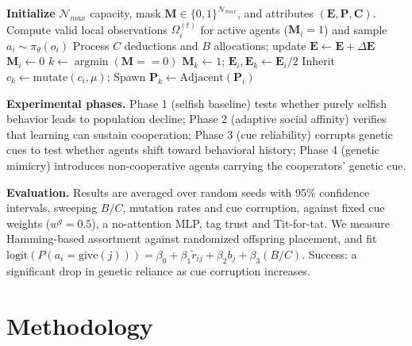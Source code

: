 \documentclass{article}
\begin{document}
\begin{algorithm}[!htbp]
\caption{Dynamic Agent Pooling and Environment Step}
\label{alg:pooling}
\begin{algorithmic}[1]
\STATE \textbf{Initialize} $\mathcal{N}_{max}$ capacity, mask $\mathbf{M} \in \{0,1\}^{\mathcal{N}_{max}}$, and attributes $(\mathbf{E}, \mathbf{P}, \mathbf{C})$.
    \STATE Compute valid local observations $\Omega_i^{(t)}$ for active agents ($\mathbf{M}_i = 1$) and sample $a_i \sim \pi_\theta(o_i)$
    \STATE Process $C$ deductions and $B$ allocations; update $\mathbf{E} \leftarrow \mathbf{E} + \Delta\mathbf{E}$
            \STATE $\mathbf{M}_i \leftarrow 0$ 
            \STATE $k \leftarrow \operatorname{argmin}(\mathbf{M} == 0)$ 
            \STATE $\mathbf{M}_k \leftarrow 1$; $\mathbf{E}_i, \mathbf{E}_k \leftarrow \mathbf{E}_i / 2$ 
            \STATE Inherit $c_k \leftarrow \text{mutate}(c_i, \mu)$; Spawn $\mathbf{P}_k \leftarrow \text{Adjacent}(\mathbf{P}_i)$
        \ENDIF
    \ENDFOR
\ENDFOR
\end{algorithmic}
\end{algorithm}

\textbf{Experimental phases.} Phase 1 (selfish baseline) tests whether purely selfish behavior leads to population decline; Phase 2 (adaptive social affinity) verifies that learning can sustain cooperation; Phase 3 (cue reliability) corrupts genetic cues to test whether agents shift toward behavioral history; Phase 4 (genetic mimicry) introduces non-cooperative agents carrying the cooperators' genetic cue.

\textbf{Evaluation.} Results are averaged over random seeds with 95\% confidence intervals, sweeping $B/C$, mutation rates and cue corruption, against fixed cue weights ($w^g=0.5$), a no-attention MLP, tag trust and Tit-for-tat. We measure Hamming-based assortment against randomized offspring placement, and fit $\text{logit}(P(a_i = \text{give}(j))) = \beta_0 + \beta_1 \tilde{r}_{ij} + \beta_2 b_j + \beta_3 (B/C)$. Success: a significant drop in genetic reliance as cue corruption increases.

\section{Methodology}
\end{document}
